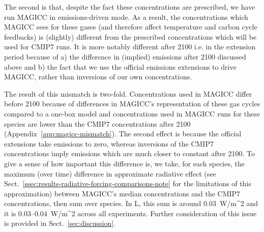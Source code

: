 The second is that, despite the fact these concentrations are prescribed, we have run MAGICC in emissions-driven mode.
As a result, the concentrations which MAGICC sees for these gases
(and therefore affect temperature and carbon cycle feedbacks)
is (slightly) different from the prescribed concentrations which will be used for CMIP7 runs.
It is more notably different after 2100 i.e. in the extension period
because of a) the difference in (implied) emissions after 2100 discussed above
and b) the fact that we use the official emissions extensions to drive MAGICC, rather than inversions of our own concentrations.

The result of this mismatch is two-fold.
Concentrations used in MAGICC differ before 2100 because of differences in MAGICC's representation of these gas cycles compared to a one-box model
and concentrations used in MAGICC runs for these species are lower than the CMIP7 concentrations after 2100
(Appendix~\ref{app:magicc-mismatch}).
The second effect is because the official extensions take emissions to zero,
whereas inversions of the CMIP7 concentrations imply emissions which are much closer to constant after 2100.
To give a sense of how important this difference is,
we take, for each species, the maximum (over time) difference in approximate radiative effect
(see Sect.~\ref{ssec:results-radiative-forcing-comparisons-note} for the limitations of this approximation)
between MAGICC's median concentrations and the CMIP7 concentrations, then sum over species.
In L, this sum is around 0.03~W/m^2
and it is 0.03--0.04~W/m^2 across all experiments.
Further consideration of this issue is provided in Sect.~\ref{sec:discussion}.

